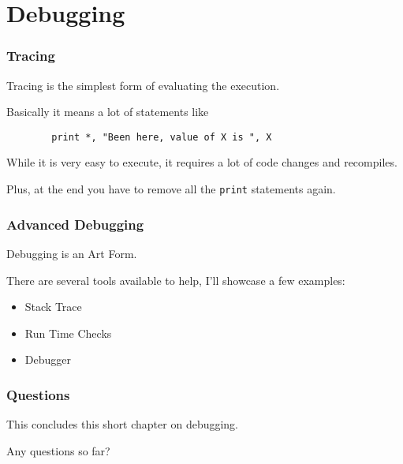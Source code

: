 \section{Debugging}

\begin{frame}[fragile]
    \frametitle{Tracing}
    Tracing is the simplest form of evaluating the execution.

    Basically it means a lot of statements like

    \begin{lstlisting}
        print *, "Been here, value of X is ", X
    \end{lstlisting}

    While it is very easy to execute, it requires a lot of code changes and recompiles.

    Plus, at the end you have to remove all the \texttt{print} statements again.
\end{frame}

\begin{frame}
    \frametitle{Advanced Debugging}
    Debugging is an Art Form.

    There are several tools available to help, I'll showcase a few examples:

    \begin{itemize}
        \item Stack Trace
        \item Run Time Checks
        \item Debugger
    \end{itemize}

\end{frame}


\begin{frame}
    \frametitle{Questions}
    This concludes this short chapter on debugging.

    Any questions so far?
\end{frame}
